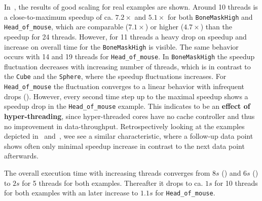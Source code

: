 \documentclass{article}
\begin{document}
In~, the results of good scaling for real examples are shown.
Around 10 threads is a close-to-maximum speedup of ca. $7.2\times $ and $5.1\times $ for both \texttt{BoneMaskHigh} and \texttt{Head\_of\_mouse}, which are comparable ($7.1\times $) or higher ($4.7\times $) than the speedup for 24 threads.
However, for 11 threads a heavy drop on speedup and increase on overall time for the \texttt{BoneMaskHigh} is visible.
The same behavior occurs with 14 and 19 threads for \texttt{Head\_of\_mouse}.
In \texttt{BoneMaskHigh} the speedup fluctuation decreases with increasing number of threads, which is in contrast to the \texttt{Cube} and the \texttt{Sphere}, where the speedup fluctuations increases.
For \texttt{Head\_of\_mouse} the fluctuation converges to a linear behavior with infrequent drops ().
However, every second time step up to the maximal speedup shows a speedup drop in the \texttt{Head\_of\_mouse} example.
This indicates to be an \textbf{effect of hyper-threading}, since hyper-threaded cores have no cache controller and thus no improvement in data-throughput.
Retrospectively looking at the examples depicted in~ and~, wee see a similar characteristic, where a follow-up data point shows often only minimal speedup increase in contrast to the next data point afterwards.
\par
The overall execution time with increasing threads converges from $8s$ () and $6s$ () to $2s$ for 5 threads for both examples.
Thereafter it drops to ca. $1s$ for 10 threads for both examples with an later increase to $1.1s$ for \texttt{Head\_of\_mouse}.
\end{document}
